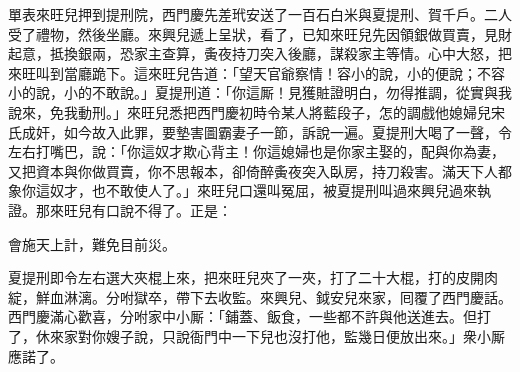 單表來旺兒押到提刑院，西門慶先差玳安送了一百石白米與夏提刑、賀千戶。二人受了禮物，然後坐廳。來興兒遞上呈狀，看了，已知來旺兒先因領銀做買賣，見財起意，抵換銀兩，恐家主查算，夤夜持刀突入後廳，謀殺家主等情。心中大怒，把來旺叫到當廳跪下。這來旺兒告道：「望天官爺察情！容小的說，小的便說；不容小的說，小的不敢說。」夏提刑道：「你這厮！見獲賍證明白，勿得推調，從實與我說來，免我動刑。」來旺兒悉把西門慶初時令某人將藍段子，怎的調戲他媳婦兒宋氏成奸，如今故入此罪，要墊害圖霸妻子一節，訴說一遍。夏提刑大喝了一聲，令左右打嘴巴，說：「你這奴才欺心背主！你這媳婦也是你家主娶的，{}配與你為妻，又把資本與你做買賣，你不思報本，卻倚醉夤夜突入臥房，持刀殺害。滿天下人都象你這奴才，也不敢使人了。」來旺兒口還叫冤屈，被夏提刑叫過來興兒過來執證。那來旺兒有口說不得了。正是：

\begin{myquote}
會施天上計，難免目前災。
\end{myquote}

夏提刑即令左右選大夾棍上來，把來旺兒夾了一夾，打了二十大棍，打的皮開肉綻，鮮血淋漓。分咐獄卒，帶下去收監。來興兒、鉞安兒來家，囘覆了西門慶話。西門慶滿心歡喜，分咐家中小厮：「鋪蓋、飯食，一些都不許與他送進去。但打了，休來家對你嫂子說，只說衙門中一下兒也沒打他，監幾日便放出來。」衆小厮應諾了。

